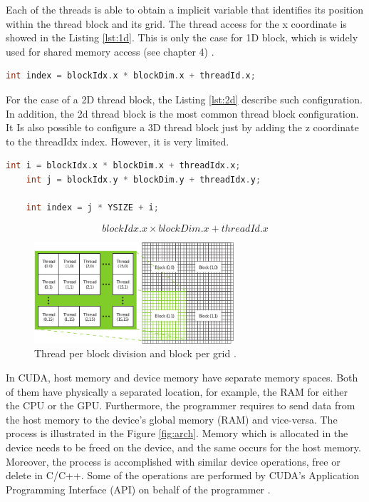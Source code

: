 Each of the threads is able to obtain a implicit variable that identifies its position within the thread block and its grid. The thread access for the x coordinate is showed in the Listing \ref{lst:1d}. This is only the case for 1D block, which is widely used for shared memory access (see chapter 4) \cite{example}.

\begin{lstlisting}[language=C++, label={lst:1d}, caption={1D thread block operation on a CUDA kernel}]	
	int index = blockIdx.x * blockDim.x + threadId.x;
\end{lstlisting}

For the case of a 2D thread block, the Listing \ref{lst:2d} describe such configuration. In addition, the 2d thread block is the most common thread block configuration. It Is also possible to configure a 3D thread block just by adding the z coordinate to the threadIdx index. However, it is very limited.

\begin{lstlisting}[language=C++, label={lst:2d}, caption={2D thread block operation on a CUDA kernel}]	
    int i = blockIdx.x * blockDim.x + threadIdx.x;
    int j = blockIdx.y * blockDim.y + threadIdx.y;
    
    int index = j * YSIZE + i;
\end{lstlisting}

$$blockIdx.x \times blockDim.x + threadId.x$$

\begin{figure}[htbp]
	\centering
		\includegraphics[width=0.66\textwidth]{Figures/grid.png}
		\smallskip
	\caption[CUDA's 2D thread grid]{Thread per block division and block per grid \cite{hwu}.}
	\label{fig:grid}
\end{figure}

In CUDA, host memory and device memory have separate memory spaces. Both of them have physically a separated location, for example, the RAM for either the CPU or the GPU. Furthermore, the programmer requires to send data from the host memory to the device's global memory (RAM) and vice-versa. The process is illustrated in the Figure \ref{fig:arch}. Memory which is allocated in the device needs to be freed on the device, and the same occurs for the host memory. Moreover, the process is accomplished with similar device operations, free or delete in C/C++. Some of the operations are performed by CUDA's Application Programming Interface (API) on behalf of the programmer \cite{hwu}.

